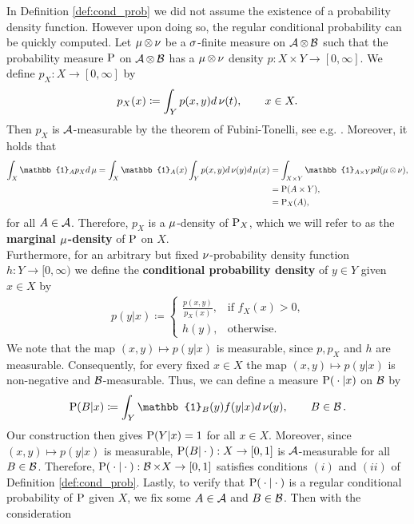 In Definition \ref{def:cond_prob} we did not assume the existence of a probability density function. However upon doing so, the regular conditional probability can be quickly computed. Let $\operatorname{\mu} \otimes \operatorname{\nu}$ be a $\operatorname{\sigma}$-finite measure on $\operatorname{\mathcal{A}} \otimes \operatorname{\mathcal{B}}$ such that the probability measure $\operatorname{\text{P}}$ on $\operatorname{\mathcal{A}} \otimes \operatorname{\mathcal{B}}$ has a $\operatorname{\mu} \otimes \operatorname{\nu}$ density $p: X \times Y \to  [0, \infty]$. We define $p_X: X \to [0, \infty]$ by
\begin{align*}
p_X(x) \coloneqq \int_{Y} p(x, y) d\operatorname{\nu}(t),\qquad x\in X.
\end{align*}
Then $p_X$ is $\operatorname{\mathcal{A}}$-measurable by the theorem of Fubini-Tonelli, see e.g. \cite[Theorem~14.16]{klenke2013probability}. Moreover, it holds that
\begin{align*}
\int_{X}\mathbb{1}_Ap_Xd\m = \int_X \mathbb{1}_A(x)\int_Yp(x,y)d\n(y)d\m(x) &= \int_{X \times Y}\mathbb{1}_{A\times Y} p d (\m \otimes \n),\\
&= \prob(A\times Y),\\
&= \prob_X(A),
\end{align*}
for all $A\in\operatorname{\mathcal{A}}$. Therefore, $p_X$ is a $\operatorname{\mu}$-density of $\operatorname{\text{P}}_X$, which we will refer to as the \textbf{marginal $\operatorname{\mu}$-density} of $\operatorname{\text{P}}$ on $X$.\\
Furthermore, for an arbitrary but fixed $\operatorname{\nu}$-probability density function $h:Y\to [0,\infty)$ we define the \textbf{conditional probability density} of $y\in Y$ given $x\in X$ by
\begin{align*}
p(y|x) \coloneqq \begin{cases}
\frac{p(x, y)}{p_X(x)}, 	&\text{if $f_X(x)>0$,}\\
h(y), 						&\text{otherwise}.
\end{cases}
\end{align*}
We note that the map $(x,y) \mapsto p(y|x)$ is measurable, since $p, p_X$ and $h$ are measurable. Consequently, for every fixed $x\in X$ the map $(x,y) \mapsto p(y|x)$ is non-negative and $\operatorname{\mathcal{B}}$-measurable. Thus, we can define a measure $\operatorname{\text{P}}({}\cdot{}|x)$ on $\operatorname{\mathcal{B}}$ by
\begin{align*}
\prob(B|x) \coloneqq \int_{Y} \mathbb{1}_B(y) f(y|x)d\n(y), \qquad B\in\B.
\end{align*}
Our construction then gives $\operatorname{\text{P}}(Y|x) = 1$ for all $x\in X$. Moreover, since $(x,y) \mapsto p(y|x)$ is measurable, $\operatorname{\text{P}}(B|{}\cdot{}):X\to [0, 1]$ is $\operatorname{\mathcal{A}}$-measurable for all $B\in\operatorname{\mathcal{B}}$. Therefore, $\operatorname{\text{P}}({}\cdot{} |{}\cdot{}):\operatorname{\mathcal{B}}\times X \to [0, 1]$ satisfies conditions $(i)$ and $(ii)$ of Definition \ref{def:cond_prob}. Lastly, to verify that $\operatorname{\text{P}}({}\cdot{} |{}\cdot{})$ is a regular conditional probability of $\operatorname{\text{P}}$ given $X$, we fix some $A\in\operatorname{\mathcal{A}}$ and $B\in\operatorname{\mathcal{B}}$. Then with the consideration
